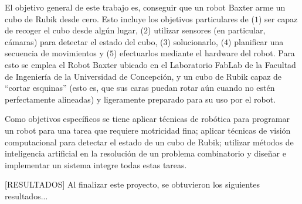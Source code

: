 El objetivo general de este trabajo es, conseguir que un robot Baxter arme un cubo de Rubik desde cero. Esto incluye los objetivos particulares de ($1$) ser capaz de recoger el cubo desde algún lugar, ($2$) utilizar sensores (en particular, cámaras) para detectar el estado del cubo, ($3$) solucionarlo, ($4$) planificar una secuencia de movimientos y ($5$) efectuarlos mediante el hardware del robot. Para esto se emplea el Robot Baxter ubicado en el Laboratorio FabLab de la Facultad de Ingeniería de la Universidad de Concepción, y un cubo de Rubik capaz de ``cortar esquinas'' (esto es, que sus caras puedan rotar aún cuando no estén perfectamente alineadas) y ligeramente preparado para su uso por el robot.

Como objetivos específicos se tiene aplicar técnicas de robótica para programar un robot para una tarea que requiere motricidad fina; aplicar técnicas de visión computacional para detectar el estado de un cubo de Rubik; utilizar métodos de inteligencia artificial en la resolución de un problema combinatorio y diseñar e implementar un sistema integre todas estas tareas.

[RESULTADOS]
Al finalizar este proyecto, se obtuvieron los siguientes resultados...
